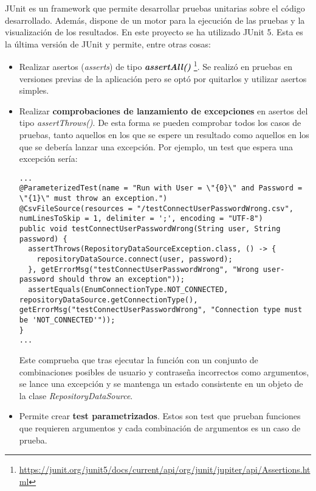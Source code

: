 JUnit es un framework que permite desarrollar pruebas unitarias sobre el código desarrollado. Además, dispone de un motor para la ejecución de las pruebas y la visualización de los resultados. En este proyecto se ha utilizado JUnit 5. Esta es la última versión de JUnit y permite, entre otras cosas:
\begin{itemize}
	\item Realizar asertos (\textit{asserts}) de tipo \textit{\textbf{assertAll()}} \footnote{\url{https://junit.org/junit5/docs/current/api/org/junit/jupiter/api/Assertions.html}}. Se realizó en pruebas en versiones previas de la aplicación pero se optó por quitarlos y utilizar asertos simples.
	
	\item Realizar \textbf{comprobaciones de lanzamiento de excepciones} en asertos del tipo \textit{assertThrows()}. De esta forma se pueden comprobar todos los casos de pruebas, tanto aquellos en los que se espere un resultado como aquellos en los que se debería lanzar una excepción. Por ejemplo, un test que espera una excepción sería:\\
\begin{minipage}{\linewidth}
{\tiny
\begin{lstlisting}[breaklines]
...
@ParameterizedTest(name = "Run with User = \"{0}\" and Password = \"{1}\" must throw an exception.")
@CsvFileSource(resources = "/testConnectUserPasswordWrong.csv", numLinesToSkip = 1, delimiter = ';', encoding = "UTF-8")
public void testConnectUserPasswordWrong(String user, String password) {
  assertThrows(RepositoryDataSourceException.class, () -> {
	repositoryDataSource.connect(user, password);
  }, getErrorMsg("testConnectUserPasswordWrong", "Wrong user-password should throw an exception"));
  assertEquals(EnumConnectionType.NOT_CONNECTED, repositoryDataSource.getConnectionType(), getErrorMsg("testConnectUserPasswordWrong", "Connection type must be 'NOT_CONNECTED'"));
}
...		
\end{lstlisting}
}
\end{minipage}
	
	Este comprueba que tras ejecutar la función con un conjunto de combinaciones posibles de usuario y contraseña incorrectos como argumentos, se lance una excepción y se mantenga un estado consistente en un objeto de la clase \textit{RepositoryDataSource}.
	
	\item Permite crear \textbf{test parametrizados}. Estos son test que prueban funciones que requieren argumentos y cada combinación de argumentos es un caso de prueba. 
	

\end{itemize}
